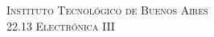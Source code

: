 %
%
%
% 
%
%
    
    
\newcommand{\HRule}{\rule{\linewidth}{0.5mm}} %
    
\center %
     
    
\textsc{\LARGE Instituto Tecnológico de Buenos Aires}\\[2cm] %
\textsc{\Large 22.13 Electrónica III}\\[1.5cm] %
    
    
